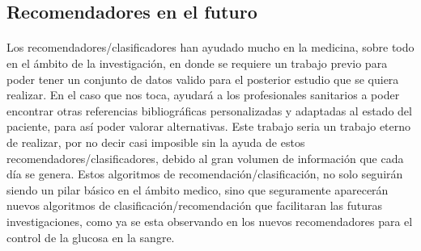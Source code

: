 \newpage
\subsection{Recomendadores en el futuro}

\paragraph{}
Los recomendadores/clasificadores han ayudado mucho en la medicina, sobre todo en el ámbito de la investigación, en donde se requiere un trabajo previo para poder tener un conjunto de datos valido para el posterior estudio que se quiera realizar. En el caso que nos toca, ayudará a los profesionales sanitarios a poder encontrar otras referencias bibliográficas personalizadas y adaptadas al estado del paciente, para así poder valorar alternativas. Este trabajo seria un trabajo eterno de realizar, por no decir casi imposible sin la ayuda de estos recomendadores/clasificadores, debido al gran volumen de información que cada día se genera. Estos algoritmos de recomendación/clasificación, no solo seguirán siendo un pilar básico en el ámbito medico, sino que seguramente aparecerán nuevos algoritmos de clasificación/recomendación que facilitaran las futuras investigaciones, como ya se esta observando en los nuevos recomendadores para el control de la glucosa en la sangre\cite{ref:refer_diabetes_control}.
